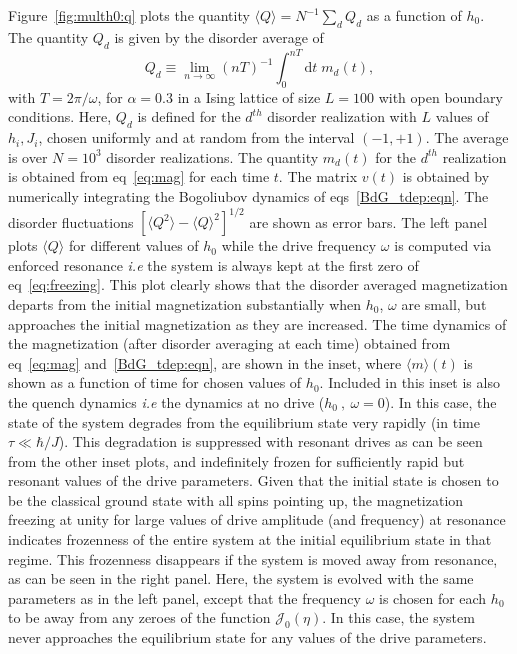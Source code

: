 \documentclass[a4paper,10pt]{article}
\begin{document}
Figure~\ref{fig:multh0:q} plots the quantity $ \langle Q \rangle = N^{-1}\sum_d Q_d$ as a function of $h_0$. The quantity $Q_d$ is given by the disorder average of
\begin{equation}
\label{eq:Qdis}
 Q_d \equiv \lim_{n\rightarrow\infty}(nT)^{-1}\int^{nT}_0 {\mathrm d}t\;m_d(t),
\end{equation}
with $T=2\pi/\omega$, for $\alpha=0.3$ in a Ising lattice of size $L=100$ with open boundary conditions. Here, $Q_d$ is defined for the $d^{th}$ disorder realization with $L$ values of $h_i,J_i$, chosen uniformly and at random from the interval $\left(-1,+1\right)$. The average is over $N=10^3$ disorder realizations. The quantity $m_d(t)$ for the $d^{th}$ realization is obtained from eq~\ref{eq:mag} for each time $t$. The matrix $v(t)$ is obtained by numerically integrating the Bogoliubov dynamics of eqs~\ref{BdG_tdep:eqn}. The disorder fluctuations $\left[\langle Q^2 \rangle - \langle Q \rangle^2\right]^{1/2}$ are shown as error bars. The left panel plots $\langle Q \rangle$ for different values of $h_0$ while the drive frequency $\omega$ is computed via enforced resonance \textit{i.e} the system is always kept at the first zero of eq~\ref{eq:freezing}. This plot clearly shows that the disorder averaged magnetization departs from the initial magnetization substantially when $h_0$, $\omega$ are small, but 
approaches the initial magnetization as they are increased. The time dynamics of the magnetization (after disorder averaging at each time) obtained from eq~\ref{eq:mag} and~\ref{BdG_tdep:eqn}, are shown in the inset, where $\langle m \rangle (t) $ is shown as a function of time for chosen values of $h_0$. Included in this inset is also the quench dynamics \textit{i.e} the dynamics at no drive ($h_0 \ ,\ \omega = 0$). In this case, the state of the system degrades from the equilibrium state very rapidly (in time $\tau \ll \hbar/J$). This degradation is suppressed with resonant drives as can be seen from the other inset plots, and indefinitely frozen for sufficiently rapid but resonant values of the drive parameters. Given that the initial state is chosen to be the classical ground state with all spins pointing up, the magnetization freezing at unity for large values of drive amplitude (and frequency) at resonance indicates frozenness of the entire system at the initial equilibrium state in that regime. This 
frozenness disappears if the system is moved away from resonance, as can be seen in the right panel. Here, the system is evolved with the same parameters as in the left panel, except that the frequency $\omega$ is chosen for each $h_0$ to be away from any zeroes of the function $\mathcal{J}_0(\eta)$. In this case, the system never approaches the equilibrium state for any values of the drive parameters.
\end{document}
